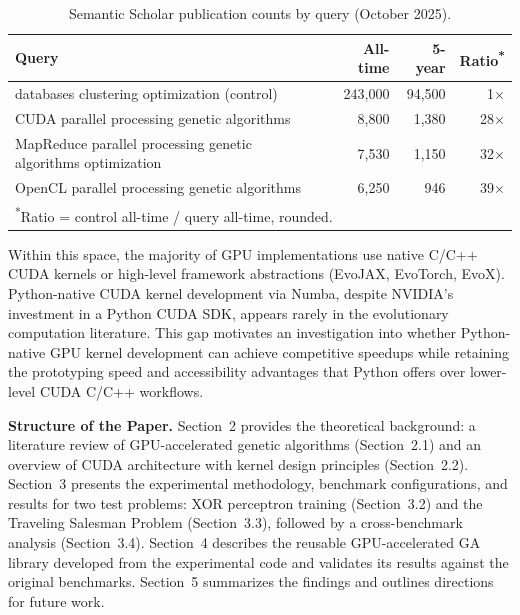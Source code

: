 \documentclass[14pt,a4paper]{extarticle}
\begin{document}
    \begin{table}[h]
    \centering
    \caption{Semantic Scholar publication counts by query (October 2025).}
    \label{tab:ss-gap}
    \small
    \begin{tabular}{p{}rrr}
    \hline
    \textbf{Query} & \textbf{All-time} & \textbf{5-year} & \textbf{Ratio}\textsuperscript{*} \\
    \hline
    databases clustering optimization (control) & 243{,}000 & 94{,}500 & 1$\times$ \\
    CUDA parallel processing genetic algorithms & 8{,}800 & 1{,}380 & 28$\times$ \\
    MapReduce parallel processing genetic algorithms optimization & 7{,}530 & 1{,}150 & 32$\times$ \\
    OpenCL parallel processing genetic algorithms & 6{,}250 & 946 & 39$\times$ \\
    \hline
    \multicolumn{4}{l}{\textsuperscript{*}Ratio = control all-time / query all-time, rounded.}
    \end{tabular}
    \end{table}

    Within this space, the majority of GPU implementations use native C/C++ CUDA kernels or high-level framework abstractions (EvoJAX, EvoTorch, EvoX). Python-native CUDA kernel development via Numba, despite NVIDIA's investment in a Python CUDA SDK, appears rarely in the evolutionary computation literature. This gap motivates an investigation into whether Python-native GPU kernel development can achieve competitive speedups while retaining the prototyping speed and accessibility advantages that Python offers over lower-level CUDA C/C++ workflows.

    \bigskip\textbf{Structure of the Paper.} Section~2 provides the theoretical background: a literature review of GPU-accelerated genetic algorithms (Section~2.1) and an overview of CUDA architecture with kernel design principles (Section~2.2). Section~3 presents the experimental methodology, benchmark configurations, and results for two test problems: XOR perceptron training (Section~3.2) and the Traveling Salesman Problem (Section~3.3), followed by a cross-benchmark analysis (Section~3.4). Section~4 describes the reusable GPU-accelerated GA library developed from the experimental code and validates its results against the original benchmarks. Section~5 summarizes the findings and outlines directions for future work.

    
\end{document}
